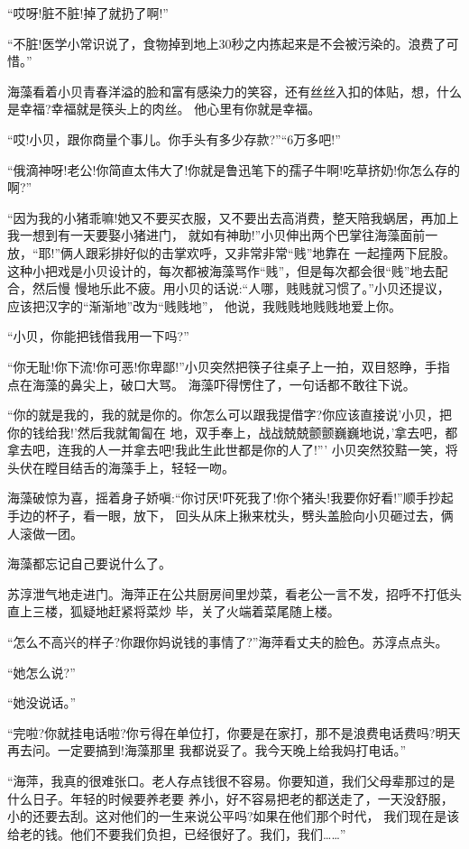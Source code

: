 \documentclass[11pt,a4paper,onecolumn]{article}
\begin{document}
``哎呀!脏不脏!掉了就扔了啊!''

``不脏!医学小常识说了，食物掉到地上30秒之内拣起来是不会被污染的。浪费了可惜。''

海藻看着小贝青春洋溢的脸和富有感染力的笑容，还有丝丝入扣的体贴，想，什么是幸福?幸福就是筷头上的肉丝。
他心里有你就是幸福。

``哎!小贝，跟你商量个事儿。你手头有多少存款?''``6万多吧!''

``俄滴神呀!老公!你简直太伟大了!你就是鲁迅笔下的孺子牛啊!吃草挤奶!你怎么存的啊?''

``因为我的小猪乖嘛!她又不要买衣服，又不要出去高消费，整天陪我蜗居，再加上我一想到有一天要娶小猪进门，
就如有神助!''小贝伸出两个巴掌往海藻面前一放，``耶!''俩人跟彩排好似的击掌欢呼，又非常非常``贱''地靠在
一起撞两下屁股。这种小把戏是小贝设计的，每次都被海藻骂作``贱''，但是每次都会很``贱''地去配合，然后慢
慢地乐此不疲。用小贝的话说:``人哪，贱贱就习惯了。''小贝还提议，应该把汉字的``渐渐地''改为``贱贱地''，
他说，我贱贱地贱贱地爱上你。

``小贝，你能把钱借我用一下吗?''

``你无耻!你下流!你可恶!你卑鄙!''小贝突然把筷子往桌子上一拍，双目怒睁，手指点在海藻的鼻尖上，破口大骂。
海藻吓得愣住了，一句话都不敢往下说。

``你的就是我的，我的就是你的。你怎么可以跟我提借字?你应该直接说'小贝，把你的钱给我!'然后我就匍匐在
地，双手奉上，战战兢兢颤颤巍巍地说，'拿去吧，都拿去吧，连我的人一并拿去吧!我此生此世都是你的人了!'''
小贝突然狡黠一笑，将头伏在瞠目结舌的海藻手上，轻轻一吻。

海藻破惊为喜，摇着身子娇嗔:``你讨厌!吓死我了!你个猪头!我要你好看!''顺手抄起手边的杯子，看一眼，放下，
回头从床上揪来枕头，劈头盖脸向小贝砸过去，俩人滚做一团。

海藻都忘记自己要说什么了。

苏淳泄气地走进门。海萍正在公共厨房间里炒菜，看老公一言不发，招呼不打低头直上三楼，狐疑地赶紧将菜炒
毕，关了火端着菜尾随上楼。

``怎么不高兴的样子?你跟你妈说钱的事情了?''海萍看丈夫的脸色。苏淳点点头。

``她怎么说?''

``她没说话。''

``完啦?你就挂电话啦?你亏得在单位打，你要是在家打，那不是浪费电话费吗?明天再去问。一定要搞到!海藻那里
我都说妥了。我今天晚上给我妈打电话。''

``海萍，我真的很难张口。老人存点钱很不容易。你要知道，我们父母辈那过的是什么日子。年轻的时候要养老要
养小，好不容易把老的都送走了，一天没舒服，小的还要去刮。这对他们的一生来说公平吗?如果在他们那个时代，
我们现在是该给老的钱。他们不要我们负担，已经很好了。我们，我们……''
\end{document}

